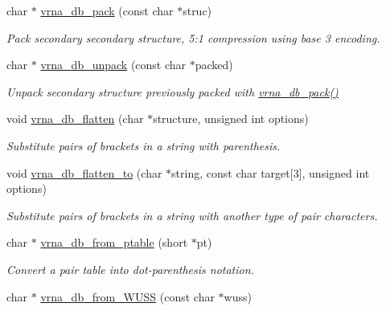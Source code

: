 \begin{DoxyCompactItemize}
\item 
char $\ast$ \mbox{\hyperlink{group__struct__utils__dot__bracket_ga55c4783060a1464f862f858d5599c9e1}{vrna\+\_\+db\+\_\+pack}} (const char $\ast$struc)
\begin{DoxyCompactList}\small\item\em Pack secondary secondary structure, 5\+:1 compression using base 3 encoding. \end{DoxyCompactList}\item 
char $\ast$ \mbox{\hyperlink{group__struct__utils__dot__bracket_ga6490adff857d84ce06e6f379ae3a4512}{vrna\+\_\+db\+\_\+unpack}} (const char $\ast$packed)
\begin{DoxyCompactList}\small\item\em Unpack secondary structure previously packed with \mbox{\hyperlink{group__struct__utils__dot__bracket_ga55c4783060a1464f862f858d5599c9e1}{vrna\+\_\+db\+\_\+pack()}} \end{DoxyCompactList}\item 
void \mbox{\hyperlink{group__struct__utils__dot__bracket_gafd1304f5a86e2e3f1425e725cde44fa2}{vrna\+\_\+db\+\_\+flatten}} (char $\ast$structure, unsigned int options)
\begin{DoxyCompactList}\small\item\em Substitute pairs of brackets in a string with parenthesis. \end{DoxyCompactList}\item 
void \mbox{\hyperlink{group__struct__utils__dot__bracket_ga690425199c8b71545e7196e3af1436f8}{vrna\+\_\+db\+\_\+flatten\+\_\+to}} (char $\ast$string, const char target\mbox{[}3\mbox{]}, unsigned int options)
\begin{DoxyCompactList}\small\item\em Substitute pairs of brackets in a string with another type of pair characters. \end{DoxyCompactList}\item 
char $\ast$ \mbox{\hyperlink{group__struct__utils__dot__bracket_gaf9ecd0d7877fecdbb0292e24f40283d5}{vrna\+\_\+db\+\_\+from\+\_\+ptable}} (short $\ast$pt)
\begin{DoxyCompactList}\small\item\em Convert a pair table into dot-\/parenthesis notation. \end{DoxyCompactList}\item 
char $\ast$ \mbox{\hyperlink{group__struct__utils__dot__bracket_ga02ca70cffb2d864f7b2d95d92218bae0}{vrna\+\_\+db\+\_\+from\+\_\+\+W\+U\+SS}} (const char $\ast$wuss)

\end{DoxyCompactItemize}
